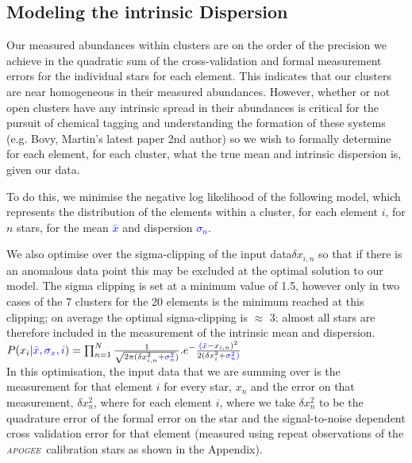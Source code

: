 \documentclass[14pt, preprint2]{aastex6}
\newcommand{\project}[1]{\textsl{#1}}
\newcommand{\apogee}{\project{\textsc{apogee}}}
\begin{document}
\subsection{Modeling the intrinsic Dispersion}

Our measured abundances within clusters are on the order of the precision we achieve in the quadratic sum of the cross-validation and formal measurement errors for the individual stars for each element. This indicates that our clusters are near homogeneous in their measured abundances. However, whether or not open clusters have any intrinsic spread in their abundances is critical for the pursuit of chemical tagging and understanding the formation of these systems (e.g. Bovy, Martin's latest paper 2nd author) so we wish to formally determine for each element, for each cluster, what the true mean and intrinsic dispersion is, given our data. 

To do this, we minimise the negative log likelihood of the following model, which represents the distribution of the elements within a cluster, for each element $i$, for $n$ stars, for the mean \textcolor{blue}{$\bar{x}$} and dispersion \textcolor{blue}{$\sigma_n$}. 

We also optimise over the sigma-clipping of the input data$ \delta x_{i, n}$ so that if there is an anomalous data point this may be excluded at the optimal solution to our model.  The sigma clipping is set at a minimum value of 1.5, however only in two cases of the 7 clusters for the 20 elements is the minimum reached at this clipping; on average the optimal sigma-clipping is $\approx$ 3: almost all stars are therefore included in the measurement of the intrinsic mean and dispersion.\\

$P({x_i} | \textcolor{blue}{\bar{x}, \sigma_x, i }) =  \prod_{n=1}^{N} \frac{1}{\sqrt{2 \pi (\delta x_{ \textcolor{blue}{i}, n} ^2 + \textcolor{blue}{{\sigma}_n^2}})} . e ^ - {\frac{\textcolor{blue}{(\bar{x}} - x_{\textcolor{blue}{i}, n})^2 }{2(\delta x_i^2 + \textcolor{blue}{\sigma_n^2)}}}$ \\

In this optimisation, the input data that we are summing over is the measurement for that element $i$ for every star, $x_n$  and the error on that measurement, $\delta x_n^2$, where for each element $i$, where we take $\delta x_n^2$ to be the quadrature error of the formal error on the star and the signal-to-noise dependent cross validation error for that element (measured using repeat observations of the \apogee\ calibration stars as shown in the Appendix). 
\end{document}
